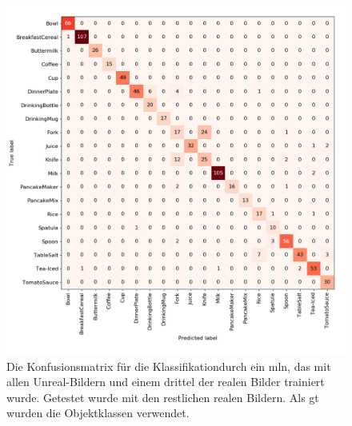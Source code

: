 \begin{figure}
\centering
	\includegraphics[scale=.3]{img/chapter6/UnrealRealMixedGTClass.png}
\caption[Konfusionsmatrix der Objektklassen Klassifikation mit gemischtem Trainingsset und realem Testset]{Die Konfusionsmatrix für die Klassifikationdurch ein \gls{mln}, das mit allen Unreal-Bildern und einem drittel der realen Bilder trainiert wurde. Getestet wurde mit den restlichen realen Bildern. Als \gls{gt} wurden die Objektklassen verwendet.}
\label{fig:UnrealRealMixedGTClass_confMatrix}
\end{figure}  


